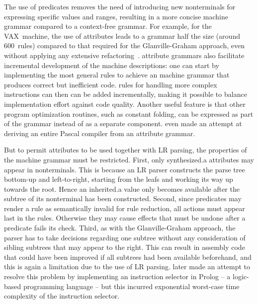 The use of \glspl{predicate} removes the need of introducing new
\glspl{nonterminal} for expressing specific values and ranges, resulting in a
more concise \gls{machine grammar} compared to a \gls{context-free grammar}.
%
For example, for the \gls{VAX}~machine, the use of \glspl{attribute} leads to a
\gls{grammar} half the size (around 600~\glspl{rule}) compared to that required
for the \gls{Glanville-Graham approach}, even without applying any extensive
\gls{refactoring}~\cite{GanapathiFischer:1985}.
%
\Glspl{attribute grammar} also facilitate incremental development of the
\glspl{machine description}: one can start by implementing the most general
\glspl{rule} to achieve an \gls{machine grammar} that produces correct but
inefficient code.
%
\Glspl{rule} for handling more complex \glspl{instruction} can then can be added
incrementally, making it possible to balance implementation effort against code
quality.
%
Another useful feature is that other \gls{program} optimization routines, such
as \gls{constant folding}, can be expressed as part of the \gls{grammar} instead
of as a separate component.
%
\textcite{Farrow:1982} even made an attempt at deriving an entire \gls{Pascal}
\gls{compiler} from an \gls{attribute grammar}.

But to permit \glspl{attribute} to be used together with \gls{LR parsing}, the
properties of the \gls{machine grammar} must be restricted.
%
First, only \gls{synthesized.a} \glspl{attribute} may appear in
\glspl{nonterminal}.
%
This is because an \gls{LR parser} constructs the \gls{parse tree} bottom-up and
left-to-right, starting from the \glspl{leaf} and working its way up towards the
\gls{root}.
%
Hence an \gls{inherited.a} value only becomes available after the \gls{subtree}
of its \gls{nonterminal} has been constructed.
%
Second, since \glspl{predicate} may render a \gls{rule} as semantically invalid
for \gls{rule reduction}, all \glspl{action} must appear last in the
\glspl{rule}.
%
Otherwise they may cause effects that must be undone after a \gls{predicate}
fails its check.
%
Third, as with the \gls{Glanville-Graham approach}, the parser has to take
decisions regarding one \gls{subtree} without any consideration of sibling
\glspl{subtree} that may appear to the right.
%
This can result in \gls{assembly code} that could have been improved if all
\glspl{subtree} had been available beforehand, and this is again a limitation
due to the use of \gls{LR parsing}.  \textcite{Ganapathi:1989} later made an
attempt to resolve this problem by implementing an \gls{instruction selector} in
\gls{Prolog} -- a logic-based programming language -- but this incurred
exponential worst-case time complexity of the \gls{instruction selector}.


